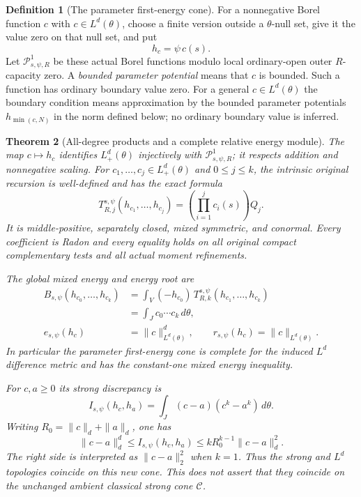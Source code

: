 \documentclass[11pt,a4paper]{article}
\numberwithin{equation}{section}
\newtheorem{theorem}{Theorem}[section]
\theoremstyle{definition}
\newtheorem{definition}[theorem]{Definition}
\theoremstyle{remark}
\begin{document}
\begin{definition}[The parameter first-energy cone]
For a nonnegative Borel function $c$ with
$c\in L^d(\theta)$, choose a finite version outside a
$\theta$-null set, give it the value zero on that null set,
and put
\[
                           h_c=\psi\,c(s).
 \tag{PD6}
\]
Let $\mathscr P^1_{s,\psi,R}$ be these actual Borel functions
modulo local ordinary-open outer $R$-capacity zero.
A \emph{bounded parameter potential} means that $c$ is bounded.
Such a function has ordinary boundary value zero. For a general
$c\in L^d(\theta)$ the boundary condition means approximation
by the bounded parameter potentials $h_{\min(c,N)}$ in
the norm defined below; no ordinary boundary value is inferred.
\end{definition}

\begin{theorem}[All-degree products and a complete relative energy module]
\label{thm:r12-parameter-Lp-BT}
The map $c\mapsto h_c$ identifies $L^d_+(\theta)$ injectively
with $\mathscr P^1_{s,\psi,R}$; it respects addition and
nonnegative scaling. For $c_1,\ldots,c_j\in L^d_+(\theta)$
and $0\leq j\leq k$, the intrinsic original recursion is
well-defined and has the exact formula
\[
 T^{s,\psi}_{R,j}(h_{c_1},\ldots,h_{c_j})
       =\left(\prod_{i=1}^j c_i(s)\right)Q_j.
 \tag{PD7}
\]
It is middle-positive, separately closed, mixed symmetric,
and conormal. Every coefficient is Radon and every equality
holds on all original compact complementary tests and
all actual moment refinements.

The global mixed energy and energy root are
\[
 \begin{split}
 B_{s,\psi}(h_{c_0},\ldots,h_{c_k})
       &=\int_V(-h_{c_0})\,
                 T^{s,\psi}_{R,k}(h_{c_1},\ldots,h_{c_k})\\
       &=\int_J c_0\cdots c_k\,d\theta,\\
 e_{s,\psi}(h_c)&=\|c\|_{L^d(\theta)}^d,\qquad
 r_{s,\psi}(h_c)=\|c\|_{L^d(\theta)} .
 \end{split}
 \tag{PD8}
\]
In particular the parameter first-energy cone is complete
for the induced $L^d$ difference metric and has the
constant-one mixed energy inequality.

For $c,a\geq0$ its strong discrepancy is
\[
 I_{s,\psi}(h_c,h_a)
       =\int_J(c-a)(c^k-a^k)\,d\theta.
 \tag{PD9}
\]
Writing $R_0=\|c\|_d+\|a\|_d$, one has
\[
 \|c-a\|_d^d\leq I_{s,\psi}(h_c,h_a)
       \leq kR_0^{k-1}\|c-a\|_d^2.
 \tag{PD10}
\]
The right side is interpreted as $\|c-a\|_2^2$ when $k=1$.
Thus the strong and $L^d$ topologies coincide on this new
cone. This does not assert that they coincide on the
unchanged ambient classical strong cone $\mathscr C$.
\end{theorem}
\end{document}
